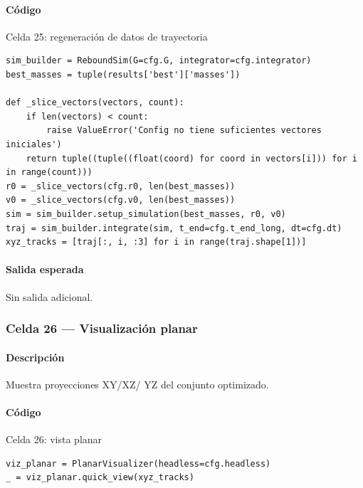 \paragraph{Código}
\begin{listing}[H]
\caption{Celda 25: regeneración de datos de trayectoria}
\begin{adjustbox}{max width=\textwidth}
\begin{minipage}{\textwidth}
\begin{verbatim}
sim_builder = ReboundSim(G=cfg.G, integrator=cfg.integrator)
best_masses = tuple(results['best']['masses'])

def _slice_vectors(vectors, count):
    if len(vectors) < count:
        raise ValueError('Config no tiene suficientes vectores iniciales')
    return tuple((tuple((float(coord) for coord in vectors[i])) for i in range(count)))
r0 = _slice_vectors(cfg.r0, len(best_masses))
v0 = _slice_vectors(cfg.v0, len(best_masses))
sim = sim_builder.setup_simulation(best_masses, r0, v0)
traj = sim_builder.integrate(sim, t_end=cfg.t_end_long, dt=cfg.dt)
xyz_tracks = [traj[:, i, :3] for i in range(traj.shape[1])]
\end{verbatim}
\end{minipage}
\end{adjustbox}
\end{listing}
\paragraph{Salida esperada} Sin salida adicional.

\subsubsection*{Celda 26 — Visualización planar}
\paragraph{Descripción} Muestra proyecciones XY/XZ/ YZ del conjunto optimizado.
\paragraph{Código}
\begin{listing}[H]
\caption{Celda 26: vista planar}
\begin{adjustbox}{max width=\textwidth}
\begin{minipage}{\textwidth}
\begin{verbatim}
viz_planar = PlanarVisualizer(headless=cfg.headless)
_ = viz_planar.quick_view(xyz_tracks)
\end{verbatim}
\end{minipage}
\end{adjustbox}
\end{listing}
